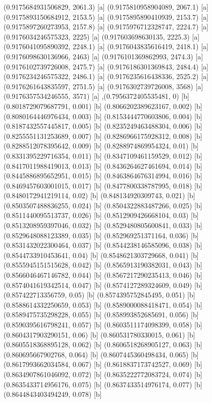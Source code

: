{{{(0.9175684931506829, 2061.3) [a] 
(0.9175810958904089, 2067.1) [a] 
(0.9175893150684912, 2153.5) [a] 
(0.9175895890410939, 2153.7) [a] 
(0.9175897260273953, 2157.8) [a] 
(0.9175976712328747, 2224.7) [a] 
(0.9176034246575323, 2225) [a] 
(0.917603698630135, 2225.3) [a] 
(0.9176041095890392, 2248.1) [a] 
(0.9176043835616419, 2418.1) [a] 
(0.9176098630136966, 2463) [a] 
(0.9176101369862993, 2474.3) [a] 
(0.9176102739726008, 2475.7) [a] 
(0.9176186301369843, 2484.4) [a] 
(0.9176234246575322, 2486.1) [a] 
(0.9176235616438336, 2525.2) [a] 
(0.9176261643835597, 2751.5) [a] 
(0.9176302739726008, 3568) [a] 
(0.9176357534246555, 3571) [a] 
},{(0.7956372405535481, 0) [b] 
(0.8018729079687791, 0.001) [b] 
(0.8066202389623167, 0.002) [b] 
(0.8080164446976434, 0.003) [b] 
(0.8153444770603806, 0.004) [b] 
(0.8187432557445817, 0.005) [b] 
(0.8235249463488304, 0.006) [b] 
(0.8255551131253689, 0.007) [b] 
(0.8286966175928312, 0.008) [b] 
(0.8288512078395642, 0.009) [b] 
(0.8288974869954324, 0.01) [b] 
(0.8331395229716354, 0.011) [b] 
(0.8347109461159529, 0.012) [b] 
(0.8417011988419013, 0.013) [b] 
(0.8436264627461694, 0.014) [b] 
(0.8445886895652951, 0.015) [b] 
(0.8463864676314994, 0.016) [b] 
(0.8469457603001015, 0.017) [b] 
(0.8477800338787995, 0.018) [b] 
(0.8480172941219114, 0.02) [b] 
(0.848134920309743, 0.021) [b] 
(0.8503507488836255, 0.024) [b] 
(0.8504322883487266, 0.025) [b] 
(0.8511440095513737, 0.026) [b] 
(0.8512909426668104, 0.03) [b] 
(0.8513208959397046, 0.032) [b] 
(0.8529480805600841, 0.033) [b] 
(0.8529648088123389, 0.035) [b] 
(0.852969251371164, 0.036) [b] 
(0.8531432022300464, 0.037) [b] 
(0.8544238146585096, 0.038) [b] 
(0.8544733910453641, 0.04) [b] 
(0.8548621303729668, 0.041) [b] 
(0.8555945151515628, 0.042) [b] 
(0.8565913190382031, 0.043) [b] 
(0.8566046467146782, 0.044) [b] 
(0.8567217290235413, 0.046) [b] 
(0.8574041619342514, 0.047) [b] 
(0.8574127289324609, 0.049) [b] 
(0.857422713356759, 0.05) [b] 
(0.8574395752845495, 0.051) [b] 
(0.8588614332250659, 0.053) [b] 
(0.8589000088418471, 0.054) [b] 
(0.8589475735298228, 0.055) [b] 
(0.858993852685691, 0.056) [b] 
(0.8590395616798241, 0.057) [b] 
(0.8603511174098399, 0.058) [b] 
(0.8604317903290151, 0.06) [b] 
(0.860531780330015, 0.061) [b] 
(0.8605518368895128, 0.062) [b] 
(0.8606518268905127, 0.063) [b] 
(0.860695667902768, 0.064) [b] 
(0.8607445360498434, 0.065) [b] 
(0.8617993662034584, 0.067) [b] 
(0.8618837173742527, 0.069) [b] 
(0.8634907861046092, 0.072) [b] 
(0.8635222772083724, 0.074) [b] 
(0.8635433714956176, 0.075) [b] 
(0.8637433514976174, 0.077) [b] 
(0.8644843403494249, 0.078) [b] 
}}}

